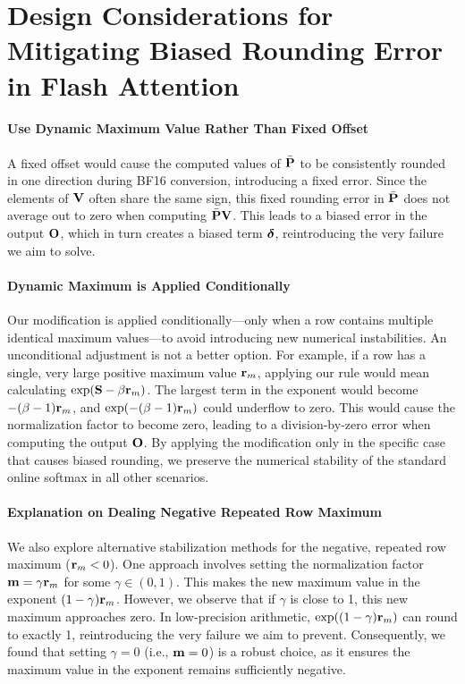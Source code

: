 \documentclass{article} %
\begin{document}
\section{Design Considerations for Mitigating Biased Rounding Error in Flash Attention}\label{app:design_consider}

\paragraph{Use Dynamic Maximum Value Rather Than Fixed Offset} A fixed offset would cause the computed values of $\bar{{\mathbf{P}}}$ to be consistently rounded in one direction during BF16 conversion, introducing a fixed error. Since the elements of ${\mathbf{V}}$ often share the same sign, this fixed rounding error in $\bar{{\mathbf{P}}}$ does not average out to zero when computing $\bar{{\mathbf{P}}}{\mathbf{V}}$. This leads to a biased error in the output ${\mathbf{O}}$, which in turn creates a biased term ${\boldsymbol{\delta}}$, reintroducing the very failure we aim to solve.


\paragraph{Dynamic Maximum is Applied Conditionally} Our modification is applied conditionally—only when a row contains multiple identical maximum values—to avoid introducing new numerical instabilities. An unconditional adjustment is not a better option. For example, if a row has a single, very large positive maximum value ${\mathbf{r}}_m$, applying our rule would mean calculating $\exp({\mathbf{S}} - \beta{\mathbf{r}}_m)$. The largest term in the exponent would become $-(\beta-1){\mathbf{r}}_m$, and $\exp(-(\beta-1){\mathbf{r}}_m)$ could underflow to zero. This would cause the normalization factor to become zero, leading to a division-by-zero error when computing the output ${\mathbf{O}}$. By applying the modification only in the specific case that causes biased rounding, we preserve the numerical stability of the standard online softmax in all other scenarios.


\paragraph{Explanation on Dealing Negative Repeated Row Maximum} We also explore alternative stabilization methods for the negative, repeated row maximum (${\mathbf{r}}_m < 0$). One approach involves setting the normalization factor ${\mathbf{m}} = \gamma {\mathbf{r}}_m$ for some $\gamma \in (0, 1)$. This makes the new maximum value in the exponent $(1-\gamma) {\mathbf{r}}_m$. However, we observe that if $\gamma$ is close to 1, this new maximum approaches zero. In low-precision arithmetic, $\exp((1-\gamma) {\mathbf{r}}_m)$ can round to exactly 1, reintroducing the very failure we aim to prevent. Consequently, we found that setting $\gamma=0$ (i.e., ${\mathbf{m}}=0$) is a robust choice, as it ensures the maximum value in the exponent remains sufficiently negative.
\end{document}
